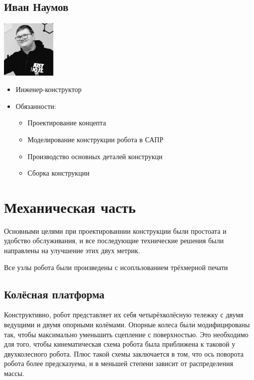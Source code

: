 \documentclass[11pt]{article}
\begin{document}
\subsection{Иван Наумов}
\label{sec:org96c6bcf}
\begin{center}
\includegraphics[width=100]{./images/ivan.jpg}
\end{center}
\begin{itemize}
\item Инженер-конструктор
\item Обязанности:
\begin{itemize}
\item Проектирование концепта
\item Моделирование конструкции робота в САПР
\item Производство основных деталей конструкци
\item Сборка конструкции
\end{itemize}
\end{itemize}
\section{Механическая часть}
\label{sec:org7fadcaf}
Основными целями при проектированнии конструкции были простоата и удобство обслуживания, и все последующие технические решения были направлены на улучшение этих двух метрик.

Все узлы робота были произведены с исопльзованием трёхмерной печати
\subsection{Колёсная платформа}
\label{sec:org92a5b89}
Конструктивно, робот представляет их себя четырёхколёсную тележку с двумя ведущими и двумя опорными колёмами. Опорные колеса были модифицированы так, чтобы максимально уменьшить сцепление с поверхностью. Это необходимо для того, чтобы кинематическая схема робота была приближена к таковой у двухколесного робота. Плюс такой схемы заключается в том, что ось поворота робота более предсказуема, и в меньшей степени зависит от распределения массы.
\end{document}
